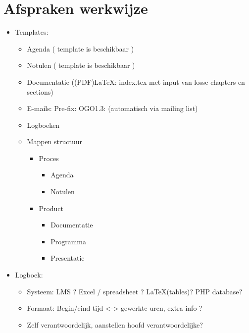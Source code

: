 \documentclass[]{article}
\begin{document}
\section{Afspraken werkwijze}\label{sec:afspraken_werkwijze} %

\begin{itemize}
    \item Templates:
        \begin{itemize}
            \item Agenda ( template is beschikbaar )
            \item Notulen ( template is beschikbaar )
            \item Documentatie ((PDF)\LaTeX : index.tex met input van losse chapters en sections)
            \item E-mails: Pre-fix: OGO1.3:  (automatisch via mailing list)
            \item Logboeken
            \item Mappen structuur
              \begin{itemize}
               \item Proces
                  \begin{itemize}
                   \item Agenda
                   \item Notulen
                  \end{itemize}
               \item Product
                  \begin{itemize}
                   \item Documentatie
                   \item Programma
                   \item Presentatie
                  \end{itemize}
              \end{itemize}
        \end{itemize}

    \item Logboek:
        \begin{itemize}
            \item Systeem: LMS ? Excel / spreadsheet ? \LaTeX (tables)? PHP database?
            \item Formaat: Begin/eind tijd <-> gewerkte uren, extra info ?
            \item Zelf verantwoordelijk, aanstellen hoofd verantwoordelijke?
        \end{itemize}


\end{itemize}
\end{document}
